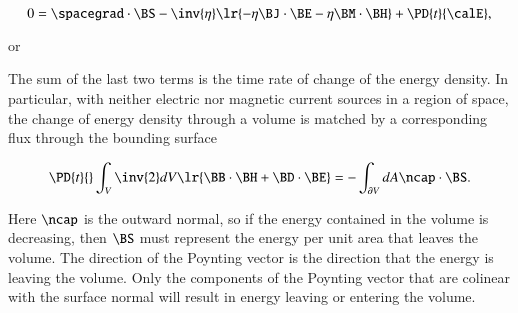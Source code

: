 \begin{dmath}\label{eqn:poyntingF:180}
0 =
\spacegrad \cdot \BS
-
\inv{\eta}
\lr{
- \eta \BJ \cdot \BE
- \eta \BM \cdot \BH
}
+ \PD{t}{\calE},
\end{dmath}

or

The sum of the last two terms is the time rate of change of the energy density.
In particular,
with neither electric nor magnetic current sources in a region of space,
the change of energy density through a volume is matched by a corresponding flux through the bounding surface

\begin{dmath}\label{eqn:maxwellsEquations:740}
\PD{t}{} \int_V
\inv{2} dV \lr{
\BB \cdot \BH
+ \BD \cdot \BE
}
=
-\int_{\partial V} dA \ncap \cdot \BS.
\end{dmath}

Here \( \ncap \) is the outward normal, so if the energy contained in the volume is decreasing, then \( \BS \) must represent the energy per unit area that leaves the volume.
The direction of the Poynting vector is the direction that the energy is leaving the volume.
Only the components of the Poynting vector that are colinear with the surface normal will result in energy leaving or entering the volume.

